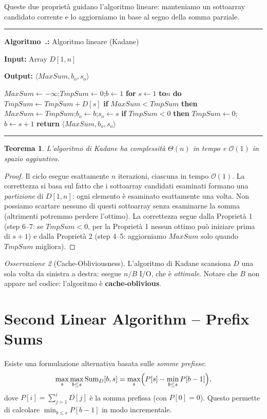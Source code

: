 \documentclass[12pt, a4paper, oneside]{book}
\newcounter{algocf}[chapter]
\renewcommand{\thealgocf}{\thechapter.\arabic{algocf}}
\newenvironment{algorithm}[1][H]{%
  \refstepcounter{algocf}%
  \par\medskip\noindent\rule{\linewidth}{0.4pt}\par\smallskip
}{%
  \par\smallskip\noindent\rule{\linewidth}{0.4pt}\par\medskip
}
\newcommand{\algcaption}[1]{\noindent\textbf{Algoritmo~\thealgocf:} #1\par\smallskip}
\newcommand{\KwIn}[1]{\noindent\textbf{Input:} #1\par}
\newcommand{\KwOut}[1]{\noindent\textbf{Output:} #1\par}
\newcommand{\For}[1]{\noindent\textbf{for} #1 \textbf{do}}
\newcommand{\If}[1]{\noindent\textbf{if} #1 \textbf{then}}
\newcommand{\Return}[1]{\noindent\textbf{return} #1}
\newcommand{\KwTo}{\textbf{to}}
\theoremstyle{plain}
\newtheorem{teorema}{Teorema}[chapter]
\theoremstyle{definition}
\theoremstyle{remark}
\newtheorem{osservazione}[teorema]{Osservazione}
\newcommand{\OO}[1]{\mathcal{O}\!\left(#1\right)}
\newcommand{\Th}[1]{\Theta\!\left(#1\right)}
\begin{document}
Queste due proprietà guidano l'algoritmo lineare: manteniamo un sottoarray candidato corrente e lo aggiorniamo in base al segno della somma parziale.

\begin{algorithm}[H]
\algcaption{Algoritmo lineare (Kadane)}
\KwIn{Array $D[1,n]$}
\KwOut{$\langle MaxSum, b_o, s_o \rangle$}
$MaxSum \leftarrow -\infty$;\quad $TmpSum \leftarrow 0$;\quad $b \leftarrow 1$\;
\For{$s \leftarrow 1$ \KwTo $n$}{
  $TmpSum \leftarrow TmpSum + D[s]$\;
  \If{$MaxSum < TmpSum$}{
    $MaxSum \leftarrow TmpSum$;\quad $b_o \leftarrow b$;\quad $s_o \leftarrow s$\;
  }
  \If{$TmpSum < 0$}{
    $TmpSum \leftarrow 0$;\quad $b \leftarrow s + 1$\;
  }
}
\Return{$\langle MaxSum, b_o, s_o \rangle$}\;
\end{algorithm}

\begin{teorema}
L'algoritmo di Kadane ha complessità $\Th{n}$ in tempo e $\OO{1}$ in spazio aggiuntivo.
\end{teorema}
\begin{proof}
Il ciclo esegue esattamente $n$ iterazioni, ciascuna in tempo $\OO{1}$. La correttezza si basa sul fatto che i sottoarray candidati esaminati formano una \emph{partizione} di $D[1,n]$: ogni elemento è esaminato esattamente una volta. Non possiamo scartare nessuno di questi sottoarray senza esaminarne la somma (altrimenti potremmo perdere l'ottimo). La correttezza segue dalla Proprietà 1 (step 6--7: se $TmpSum < 0$, per la Proprietà 1 nessun ottimo può iniziare prima di $s+1$) e dalla Proprietà 2 (step 4--5: aggiorniamo $MaxSum$ solo quando $TmpSum$ migliora).
\end{proof}

\begin{osservazione}[Cache-Obliviousness]
L'algoritmo di Kadane scansiona $D$ una sola volta da sinistra a destra: esegue $n/B$ I/O, che è \emph{ottimale}. Notare che $B$ non appare nel codice: l'algoritmo è \textbf{cache-oblivious}.
\end{osservazione}

\section{Second Linear Algorithm -- Prefix Sums}

Esiste una formulazione alternativa basata sulle \emph{somme prefisse}:
\[
\max_s \max_{b \le s} \mathrm{Sum}_D[b,s] = \max_s \Bigl( P[s] - \min_{b \le s} P[b-1] \Bigr),
\]
dove $P[i] = \sum_{j=1}^{i} D[j]$ è la somma prefissa (con $P[0] = 0$). Questo permette di calcolare $\min_{b \le s} P[b-1]$ in modo incrementale.
\end{document}
